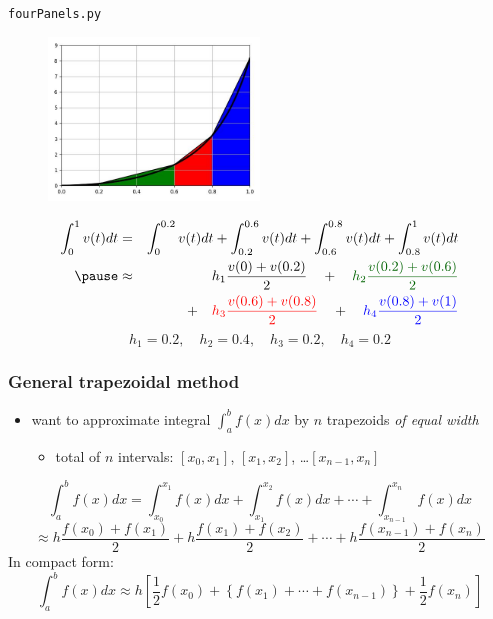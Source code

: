 \documentclass[english,14pt]{beamer}
\newcommand\red[1]{{\color{red} #1}}
\newcommand\blue[1]{{\color{blue} #1}}
\newcommand\darkGreen[1]{{\color{darkGreen} #1}}
\begin{document}

\begin{frame}[fragile]

\frametitle{}

\vspace*{-1mm}
{\footnotesize
\texttt{fourPanels.py}}
\vspace*{-3mm}
\begin{figure}[ht]
	\centering
	\includegraphics[width=0.5\textwidth]{figures/fourPanel}
\end{figure}
\vspace*{-5mm}
{\small
\begin{eqnarray*}
\int_0^1 v(t)dt & = & \int_0^{0.2} v(t)dt + \int_{0.2}^{0.6} v(t)dt + \int_{0.6}^{0.8} v(t)dt + \int_{0.8}^1 v(t)dt \\
\pause
&\approx & h_1 \frac{v(0) + v(0.2)}{2} \quad+\quad \darkGreen{h_2 \frac{v(0.2) + v(0.6)}{2}} \\
& & \quad+\quad \red{h_3 \frac{v(0.6) + v(0.8)}{2}} \quad+\quad \blue{h_4 \frac{v(0.8) + v(1)}{2}} 
\end{eqnarray*}
}
\pause
\vspace*{-5mm}
\[
h_1 = 0.2, \quad h_2 = 0.4, \quad h_3 = 0.2, \quad h_4 = 0.2
\]

\end{frame}


\begin{frame}[fragile]

\frametitle{General trapezoidal method}

\begin{itemize}
	\item want to approximate integral $\int_a^b f(x)dx$ by $n$ trapezoids \emph{of equal width}
	\begin{itemize}
		\item total of $n$ intervals: $[x_0,x_1]$, $[x_1,x_2]$, \ldots $[x_{n-1},x_n]$
	\end{itemize}
\end{itemize}

{\small
\[
\int_a^b f(x)dx = \int_{x_0}^{x_1} f(x)dx + \int_{x_1}^{x_2} f(x)dx + \cdots + \int_{x_{n-1}}^{x_n} f(x)dx
\]
\pause
\[
\approx h\frac{f(x_0)+f(x_1)}{2} + h\frac{f(x_1)+f(x_2)}{2} + \cdots + h\frac{f(x_{n-1}) + f(x_n)}{2}
\]
\pause
In compact form:
\blue{
\[
\int_a^b f(x)dx \approx h \left[ \frac{1}{2}f(x_0) + \left\{ f(x_1)+\cdots+f(x_{n-1}) \right\} + \frac{1}{2}f(x_n) \right]
\]
}}

\end{frame}
\end{document}
